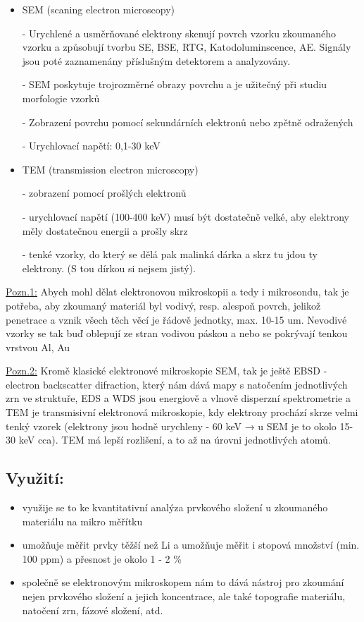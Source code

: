 \begin{itemize}
    \item SEM (scaning electron microscopy)
    
    - Urychlené a usměrňované elektrony skenují povrch vzorku zkoumaného vzorku a způsobují tvorbu SE, BSE, RTG, Katodoluminscence, AE. Signály jsou poté zaznamenány příslušným detektorem a analyzovány.

    - SEM poskytuje trojrozměrné obrazy povrchu a je užitečný při studiu morfologie vzorků

    - Zobrazení povrchu pomocí sekundárních elektronů nebo zpětně odražených
    
    - Urychlovací napětí: 0,1-30 keV

    
    \item TEM (transmission electron microscopy)

    - zobrazení pomocí prošlých elektronů
	
    - urychlovací napětí (100-400 keV) musí být dostatečně velké, aby elektrony měly dostatečnou energii a prošly skrz
	
    - tenké vzorky, do který se dělá pak malinká dárka a skrz tu jdou ty elektrony. (S tou dírkou si nejsem jistý). 
\end{itemize}

\underline{Pozn.1:} Abych mohl dělat elektronovou mikroskopii a tedy i mikrosondu, tak je potřeba, aby zkoumaný materiál byl vodivý, resp. alespoň povrch, jelikož penetrace a vznik všech těch věcí je řádově jednotky, max. 10-15 um. Nevodivé vzorky se tak buď oblepují ze stran vodivou páskou a nebo se pokrývají tenkou vrstvou Al, Au

\underline{Pozn.2:} Kromě klasické elektronové mikroskopie SEM, tak je ještě EBSD - electron backscatter difraction, který nám dává mapy s natočením jednotlivých zrn ve struktuře, EDS a WDS jsou energiově a vlnově disperzní spektrometrie a TEM je transmisivní elektronová mikroskopie, kdy elektrony prochází skrze velmi tenký vzorek (elektrony jsou hodně urychleny - 60 keV → u SEM je to okolo 15-30 keV cca). TEM má lepší rozlišení, a to až na úrovni jednotlivých atomů.

\subsection{Využití:}

\begin{itemize}
    \item využije se to ke kvantitativní analýza prvkového složení u zkoumaného materiálu na mikro měřítku
    
    \item umožňuje měřit prvky těžší než Li a umožňuje měřit i stopová množství (min. 100 ppm) a přesnost je okolo 1 - 2 \%
    
    \item společně se elektronovým mikroskopem nám to dává nástroj pro zkoumání nejen prvkového složení a jejich koncentrace, ale také topografie materiálu, natočení zrn, fázové složení, atd.

\end{itemize}


